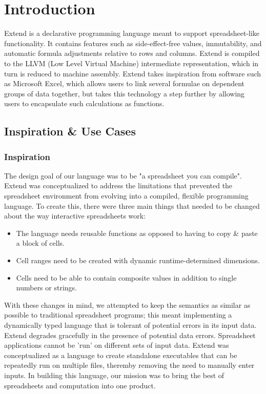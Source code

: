 \chapter{Introduction}
Extend is a declarative programming language meant to support spreadsheet-like functionality. It contains features such as side-effect-free values, immutability, and automatic formula adjustments relative to rows and columns. Extend is compiled to the LLVM (Low Level Virtual Machine) intermediate representation, which in turn is reduced to machine assembly. Extend takes inspiration from software such as Microsoft Excel, which allows users to link several formulae on dependent groups of data together, but takes this technology a step further by allowing users to encapsulate such calculations as functions.

\section{Inspiration \& Use Cases}

	\subsection{Inspiration}
	The design goal of our language was to be "a spreadsheet you can compile". Extend was conceptualized to address the limitations that prevented the spreadsheet environment from evolving into a compiled, flexible programming language. To create this, there were three main things that needed to be changed about the way interactive spreadsheets work:
		\begin{itemize}
			\item The language needs reusable functions as opposed to having to copy \& paste a block of cells.
			\item Cell ranges need to be created with dynamic runtime-determined dimensions.
			\item Cells need to be able to contain composite values in addition to single numbers or strings.
		\end{itemize}
	With these changes in mind, we attempted to keep the semantics as similar as possible to traditional spreadsheet programs; this meant implementing a dynamically typed language that is tolerant of potential errors in its input data. Extend degrades gracefully in the presence of potential data errors.
	\newline \newline
	Spreadsheet applications cannot be 'run' on different sets of input data. Extend was conceptualized as a language to create standalone executables that can be repeatedly run on multiple files, theremby removing the need to manually enter inputs. In building this language, our mission was to bring the best of spreadsheets and computation into one product.

